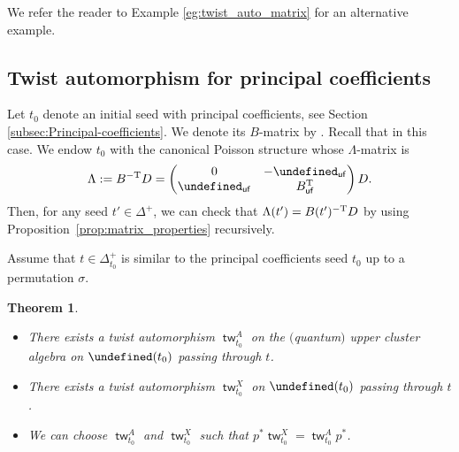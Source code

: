 \documentclass[10pt,a4paper]{amsart}
\renewcommand{\tilde}[1]{\widetilde{#1}}
\newcommand{\opname}[1]{\operatorname{\mathsf{#1}}}
\newcommand{\tw}{{\tilde{w}}}
\newcommand{\ufv}{\opname{uf}}
\let\upClAlg\undefined
\let\XClAlg\undefined
\let\Id\undefined
\renewcommand{\tw}{\opname{tw}}
\newcommand{\upClAlg}{\mathcal{U}^A}
\newcommand{\XClAlg}{\mathcal{U}^X}
\newcommand{\Id}{{\opname{Id}}}
\renewcommand{\tw}{\opname{tw}}
\numberwithin{equation}{section}
\newtheorem{Theorem}{Theorem}[section]
\begin{document}
We refer the reader to Example \ref{eg:twist_auto_matrix} for an
alternative example.

\subsection{Twist automorphism for principal coefficients\label{subsec:Cluster-twist-automorphism-principal}}

Let $t_{0}$ denote an initial seed with principal coefficients, see
Section \ref{subsec:Principal-coefficients}. We denote its $B$-matrix
by \smash{$B=\left(\begin{smallmatrix}
B_{\ufv} & -\Id_{\ufv}\\
\Id_{\ufv} & 0
\end{smallmatrix}\right)$}. Recall that \smash{$D=\left(\begin{smallmatrix}
D_{\ufv}\\
 & D_{\ufv}
\end{smallmatrix}\right)$} in this case. We endow $t_{0}$ with the canonical Poisson structure whose $\Lambda$-matrix is
\[
\Lambda:= B^{\rm -T}D=\left(\begin{matrix}
0 & -\Id_{\ufv}\\
\Id_{\ufv} & B_{\ufv}^{\rm T}
\end{matrix}\right)D.
\] Then, for any seed $t'\in\Delta^{+}$, we can check
that $\Lambda(t')= B(t')^{\rm -T}D$ by using Proposition~\ref{prop:matrix_properties}
recursively.

Assume that $t\in\Delta_{t_0}^{+}$ is similar to the principal coefficients
seed $t_{0}$ up to a permutation $\sigma$.

\begin{Theorem}\label{thm:twist_principal_coeff}\quad
\begin{itemize}\itemsep=0pt
\item[$(1)$] There exists a twist automorphism $\tw_{t_{0}}^{A}$ on the $($quantum$)$ upper cluster algebra on
$\upClAlg(t_{0})$ passing through $t$.
\item[$(2)$] There exists a twist automorphism $\tw_{t_{0}}^{X}$ on
$\XClAlg(t_{0})$ passing through $t$.
\item[$(3)$] We can choose $\tw_{t_{0}}^{A}$ and $\tw_{t_{0}}^{X}$ such that
$p^{*}\tw_{t_{0}}^{X}=\tw_{t_{0}}^{A}p^{*}$.
\end{itemize}
\end{Theorem}
\end{document}
